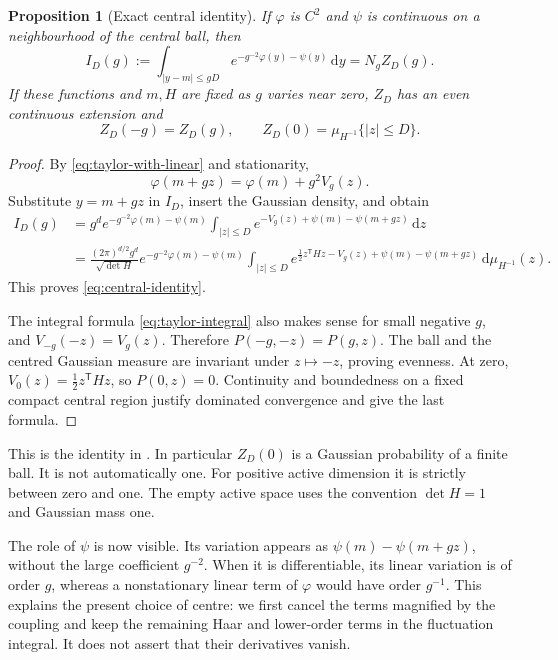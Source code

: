 \documentclass[11pt,reqno]{amsart}
\numberwithin{equation}{section}
\newtheorem{proposition}[theorem]{Proposition}
\theoremstyle{definition}
\theoremstyle{remark}
\newcommand{\dd}{\mathrm d}
\begin{document}
\begin{proposition}[Exact central identity]
\label{prop:central}
If \(\varphi\) is \(C^2\) and \(\psi\) is continuous on a
neighbourhood of the central ball, then
\begin{equation}
 I_D(g):=\int_{|y-m|\le gD}
                       e^{-g^{-2}\varphi(y)-\psi(y)}\,\dd y
                         =N_gZ_D(g).
 \label{eq:central-identity}
\end{equation}
If these functions and \(m,H\) are fixed as \(g\)
varies near zero, \(Z_D\) has an even continuous extension and
\begin{equation}
          Z_D(-g)=Z_D(g),\qquad
          Z_D(0)=\mu_{H^{-1}}\{|z|\le D\}.
 \label{eq:central-parity}
\end{equation}
\end{proposition}
\begin{proof}
By \eqref{eq:taylor-with-linear} and stationarity,
\[
          \varphi(m+gz)=\varphi(m)+g^2V_g(z).
\]
Substitute \(y=m+gz\) in \(I_D\), insert the Gaussian
density, and obtain
\begin{align*}
 I_D(g)
 &=g^de^{-g^{-2}\varphi(m)-\psi(m)}
       \int_{|z|\le D}
               e^{-V_g(z)+\psi(m)-\psi(m+gz)}\,\dd z\\
 &=\frac{(2\pi)^{d/2}g^d}{\sqrt{\det H}}
       e^{-g^{-2}\varphi(m)-\psi(m)}
       \int_{|z|\le D}
         e^{\frac12z^{\mathsf T}H z-V_g(z)
                           +\psi(m)-\psi(m+gz)}
                                       \,\dd\mu_{H^{-1}}(z).
\end{align*}
This proves \eqref{eq:central-identity}.

The integral formula \eqref{eq:taylor-integral} also makes sense
for small negative \(g\), and
\(V_{-g}(-z)=V_g(z)\). Therefore
\(P(-g,-z)=P(g,z)\). The ball and the centred Gaussian measure
are invariant under \(z\mapsto-z\), proving evenness.
At zero, \(V_0(z)=\tfrac12z^{\mathsf T}H z\), so
\(P(0,z)=0\). Continuity and boundedness on a fixed compact
central region justify dominated convergence and give the last
formula.
\end{proof}

This is the identity in \cite[Proposition~12.1, (12.7)--(12.8),
p.~40]{Main}. In particular \(Z_D(0)\) is a Gaussian probability
of a finite ball. It is not automatically one. For positive active
dimension it is strictly between zero and one. The empty active
space uses the convention \(\det H=1\) and Gaussian mass one.

The role of \(\psi\) is now visible. Its variation appears as
\(\psi(m)-\psi(m+gz)\), without the large coefficient
\(g^{-2}\). When it is differentiable, its linear variation is of
order \(g\), whereas a nonstationary linear term of \(\varphi\)
would have order \(g^{-1}\). This explains the present choice of
centre: we first cancel the terms magnified by the coupling and
keep the remaining Haar and lower-order terms in the fluctuation
integral. It does not assert that their derivatives vanish.
\end{document}
